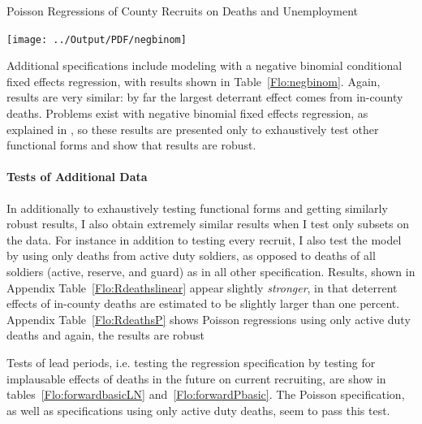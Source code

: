 \documentclass[12pt] {article}
\begin{document}
\pagebreak{}
\begin{table}
\caption{Poisson Regressions of County Recruits on Deaths and Unemployment}
\label{Flo:Poisson Basic}
\scalebox{1}{}
\end{table}


\pagebreak{}
\clearpage{}
\begin{table}
\caption{}
\label{Flo:negbinom}
\texttt{[image: ../Output/PDF/negbinom]}
\end{table}

Additional specifications include modeling %
with a negative binomial conditional fixed effects regression, with results shown in Table~\ref{Flo:negbinom}. Again, results are very similar: by far the largest deterrant effect comes from in-county deaths. Problems exist with negative binomial fixed effects regression, as explained in \cite{negbinom}, so these results are presented only to exhaustively test other functional forms and show that results are robust. 

\paragraph{Tests of Additional Data}
In additionally to exhaustively testing functional forms and getting similarly robust results, I also obtain extremely similar results when I test only subsets on the data. For instance 
in addition to testing every recruit, I also test the model by using only deaths from active duty soldiers, as opposed to deaths of all soldiers (active, reserve, and guard) as in all other specification. Results, shown in Appendix Table~\ref{Flo:Rdeathslinear} appear slightly \textit{stronger}, in that deterrent effects of in-county deaths are estimated to be slightly larger than one percent. Appendix Table~\ref{Flo:RdeathsP} shows Poisson regressions using only active duty deaths and again, the results are robust

Tests of lead periods, i.e. testing the regression specification by testing for implausable effects of deaths in the future on current recruiting, are show in tables~\ref{Flo:forwardbasicLN} and~\ref{Flo:forwardPbasic}. The Poisson specification, as well as specifications using only active duty deaths, seem to pass this test.
\end{document}
